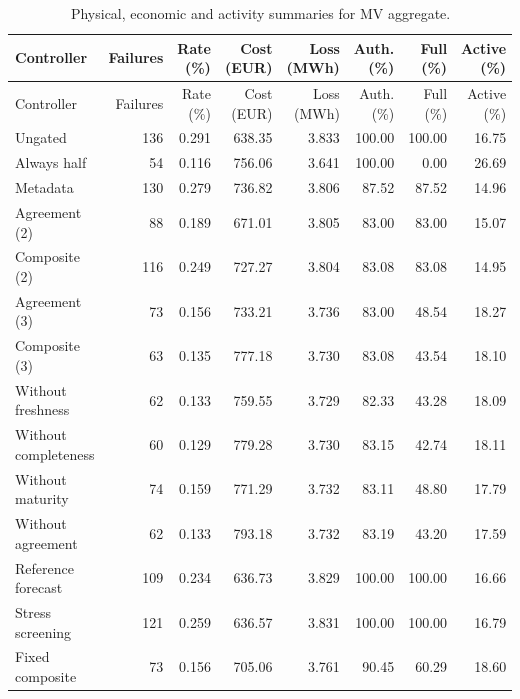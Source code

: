 \documentclass[11pt]{article}
\begin{document}
\small\begin{longtable}{lrrrrrrr}
\caption{Physical, economic and activity summaries for MV aggregate.}\\\toprule
Controller & Failures & Rate (\%) & Cost (EUR) & Loss (MWh) & Auth. (\%) & Full (\%) & Active (\%)\\\midrule
\endfirsthead
\toprule
Controller & Failures & Rate (\%) & Cost (EUR) & Loss (MWh) & Auth. (\%) & Full (\%) & Active (\%)\\\midrule
\endhead
\bottomrule\endfoot
Ungated & 136 & 0.291 & 638.35 & 3.833 & 100.00 & 100.00 & 16.75\\
Always half & 54 & 0.116 & 756.06 & 3.641 & 100.00 & 0.00 & 26.69\\
Metadata & 130 & 0.279 & 736.82 & 3.806 & 87.52 & 87.52 & 14.96\\
Agreement (2) & 88 & 0.189 & 671.01 & 3.805 & 83.00 & 83.00 & 15.07\\
Composite (2) & 116 & 0.249 & 727.27 & 3.804 & 83.08 & 83.08 & 14.95\\
Agreement (3) & 73 & 0.156 & 733.21 & 3.736 & 83.00 & 48.54 & 18.27\\
Composite (3) & 63 & 0.135 & 777.18 & 3.730 & 83.08 & 43.54 & 18.10\\
Without freshness & 62 & 0.133 & 759.55 & 3.729 & 82.33 & 43.28 & 18.09\\
Without completeness & 60 & 0.129 & 779.28 & 3.730 & 83.15 & 42.74 & 18.11\\
Without maturity & 74 & 0.159 & 771.29 & 3.732 & 83.11 & 48.80 & 17.79\\
Without agreement & 62 & 0.133 & 793.18 & 3.732 & 83.19 & 43.20 & 17.59\\
Reference forecast & 109 & 0.234 & 636.73 & 3.829 & 100.00 & 100.00 & 16.66\\
Stress screening & 121 & 0.259 & 636.57 & 3.831 & 100.00 & 100.00 & 16.79\\
Fixed composite & 73 & 0.156 & 705.06 & 3.761 & 90.45 & 60.29 & 18.60\\
\end{longtable}\normalsize
\end{document}
